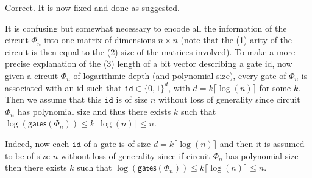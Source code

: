 \answer Correct. It is now fixed and done as suggested.
\bigskip

\begin{comment}
	Algorithm 1: Also, please note that you overload $n$ with many different meanings:
	(1) arity of the circuit, (2) size of the matrices, and (3) length of a bit vector describing a gate id.
\end{comment}

\answer It is confusing but somewhat necessary to encode all the information of the circuit $\Phi_n$ into one
matrix of dimensions $n\times n$ (note that the (1) arity of the circuit is then equal to the (2) size of the matrices involved).
To make a more precise explanation of the (3) length of a bit vector describing a gate id,
now given a circuit $\Phi_n$ of logarithmic depth
(and polynomial size), every gate of $\Phi_n$ is associated with an id
such that $\texttt{id}\in\lbrace 0,1 \rbrace^{d}$, with $d=k\lceil\log(n)\rceil$ for some $k$.
Then we assume that this $\texttt{id}$ is of size $n$ without loss of generality since circuit $\Phi_n$ has polynomial size and thus there exists $k$ such that
$\log(\mathsf{gates}(\Phi_n)) \leq k\lceil\log(n)\rceil\leq n$.
\bigskip
{}


\begin{comment}
	Algorithm 1: Why are gate ids of linear length in the input? This would correspond to an
	circuit of exponential size.
\end{comment}

\answer Indeed, now each $\texttt{id}$ of a gate is of size $d=k\lceil\log(n)\rceil$ and then it is assumed to be of size $n$ without loss of generality
since if circuit $\Phi_n$ has polynomial size then there exists $k$ such that
$\log(\mathsf{gates}(\Phi_n)) \leq k\lceil\log(n)\rceil\leq n$.
\bigskip


\begin{comment}
	Proposition 5.2: First of all, add a runtime bound to the Turing machine. I do not believe that
	your construction can simulate every linear space machine without restrictions
	on the runtime.
\end{comment}

\answer \TODO
{}
\bigskip


\begin{comment}
	Proposition 5.2: And now: Why do you write up the proof using the most complicated type of TMs
	possible? For your construction it would be perfectly sufficient to have a
	single tape machine. Your computations take at most two IDs of size $O(log(n))$
	as input and produce one such ID as output. This even fits on a single tape if
	you restrict to length $n$. You are assuming $n > n_0$ for some sufficiently large $n_0$
	anyway. Using only a single tape makes the construction much more readable, as you can
	get rid of many indices.
\end{comment}

